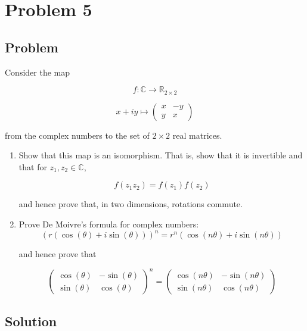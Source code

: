\documentclass[12pt]{article}
\begin{document}
\section{Problem 5}

\subsection{Problem}

Consider the map

\begin{equation}
    f: \mathbb{C} \rightarrow \mathbb{R}_{2 \times 2}
\end{equation}

\[
    x + iy \mapsto
    \begin{pmatrix}
        x & -y \\
        y & x
    \end{pmatrix}
\]

from the complex numbers to the set of \(2 \times 2\) real matrices.

\renewcommand{\labelenumi}{(\alph{enumi})}
\begin{enumerate}
    \item Show that this map is an isomorphism. That is, show that it is invertible and that for \(z_{1}, z_{2} \in \mathbb{C}\),

          \begin{equation}
              f\left(z_{1} z_{2}\right)=f\left(z_{1}\right) f\left(z_{2}\right)
          \end{equation}

          and hence prove that, in two dimensions, rotations commute.
    \item Prove De Moivre's formula for complex numbers:
          \begin{equation}
              (r(\cos (\theta)+i \sin (\theta)))^{n}=r^{n}(\cos (n \theta)+i \sin (n \theta))
          \end{equation}

          and hence prove that

          \begin{equation}
              \left(\begin{array}{cc}
                  \cos (\theta) & -\sin (\theta) \\
                  \sin (\theta) & \cos (\theta)
              \end{array}\right)^{n}=\left(\begin{array}{cc}
                      \cos (n \theta) & -\sin (n \theta) \\
                      \sin (n \theta) & \cos (n \theta)
                  \end{array}\right)
          \end{equation}
\end{enumerate}

\subsection{Solution}



\nocite{El-Deeb_PEU-323_Assignments}
\end{document}
